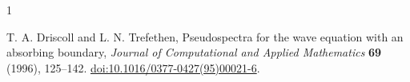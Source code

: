 \documentclass[10pt]{article}
\begin{document}
\begin{thebibliography}{1}
\raggedright
{}
T. A. Driscoll and L. N. Trefethen,
Pseudospectra for the wave equation with an absorbing boundary,
\emph{Journal of Computational and Applied Mathematics} \textbf{69}
(1996), 125--142.
\href{https://doi.org/10.1016/0377-0427(95)00021-6}{doi:10.1016/0377-0427(95)00021-6}.
\end{thebibliography}
\end{document}
